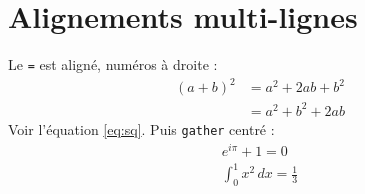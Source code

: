 \documentclass{article}
\begin{document}
\hsize=380pt
\section{Alignements multi-lignes}
Le \texttt{=} est align\'e, num\'eros \`a droite :
\begin{align}
(a+b)^2 &= a^2 + 2ab + b^2 \label{eq:sq} \\
        &= a^2 + b^2 + 2ab
\end{align}
Voir l'\'equation \eqref{eq:sq}. Puis \texttt{gather} centr\'e :
\begin{gather}
e^{i\pi} + 1 = 0 \\
\int_0^1 x^2\,dx = \tfrac{1}{3}
\end{gather}
\end{document}
